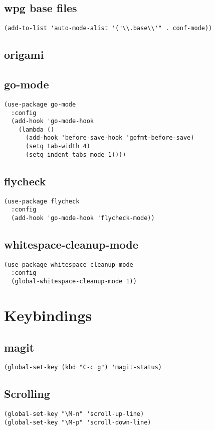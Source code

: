 \documentclass[11pt]{article}
\begin{document}
\subsection{wpg base files}
\label{sec:org7ebee7d}
\begin{verbatim}
(add-to-list 'auto-mode-alist '("\\.base\\'" . conf-mode))
\end{verbatim}
\subsection{origami}
\label{sec:org4d91261}
\subsection{go-mode}
\label{sec:org767ebfd}
\begin{verbatim}
(use-package go-mode
  :config
  (add-hook 'go-mode-hook
    (lambda ()
      (add-hook 'before-save-hook 'gofmt-before-save)
      (setq tab-width 4)
      (setq indent-tabs-mode 1))))
\end{verbatim}
\subsection{flycheck}
\label{sec:org91f5a40}
\begin{verbatim}
(use-package flycheck
  :config
  (add-hook 'go-mode-hook 'flycheck-mode))
\end{verbatim}
\subsection{whitespace-cleanup-mode}
\label{sec:org115c878}
\begin{verbatim}
(use-package whitespace-cleanup-mode
  :config
  (global-whitespace-cleanup-mode 1))
\end{verbatim}
\section{Keybindings}
\label{sec:org52db82b}
\subsection{magit}
\label{sec:orgafb2753}
\begin{verbatim}
(global-set-key (kbd "C-c g") 'magit-status)
\end{verbatim}
\subsection{Scrolling}
\label{sec:org660460c}
\begin{verbatim}
(global-set-key "\M-n" 'scroll-up-line)
(global-set-key "\M-p" 'scroll-down-line)
\end{verbatim}
\end{document}
